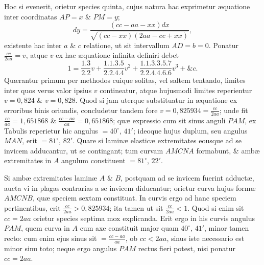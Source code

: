 Hoc si evenerit, orietur species quinta, cujus natura hac exprimetur æquatione inter coordinatas $AP=x$ \& $PM=y$;
\[dy=\frac{(cc-aa-xx)dx}{\sqrt{(cc-xx)(2aa-cc+xx)}},\]
existente hac inter $a$ \& $c$ relatione, ut sit intervallum $AD=b=0$. Ponatur
$\frac{cc}{2aa}=v$, atque $v$ ex hac æquatione infinita definiri debet
\[1=\frac{1.3}{2.2}v+\frac{1.1.3.5}{2.2.4.4}v^2+\frac{1.1.3.3.5.7}{2.2.4.4.6.6}v^3+\&c.\]
Quærantur primum per methodos cuique solitas, vel saltem tentando, limites inter quos verus valor ipsius $v$ contineatur, atque hujusmodi limites reperientur $v=0{,}824$ \& $v=0{,}828$. Quod si jam uterque substituatur in æquatione ex erroribus binis oriundis, concludetur tandem fore $v=0{,}825934=\frac{cc}{2aa}$; unde fit $\frac{cc}{aa}=1{,}651868$ \& $\frac{cc-aa}{aa}=0{,}651868$; quæ expressio cum sit sinus anguli $PAM$, ex Tabulis reperietur hic angulus $=40^\circ$, $41'$; ideoque hujus duplum, seu angulus $MAN$, erit $=81^\circ$, $82'$. Quare si laminæ elasticæ extremitates eousque ad se invicem adducantur, ut se contingant; tum curvam $AMCNA$ formabunt, \& ambæ extremitates in $A$ angulum constituent $=81^\circ$, $22'$.

Si ambæ extremitates laminæ $A$ \& $B$, postquam ad se invicem fuerint adductæ, aucta vi in plagas contrarias a se invicem diducantur; orietur curva hujus formæ $AMCNB$, quæ speciem sextam constituat. In curvis ergo ad hanc speciem pertinentibus, erit $\frac{cc}{2aa}>0{,}825934$; ita tamen ut sit $\frac{cc}{2aa}<1$. Quod si enim sit $cc=2aa$ orietur species septima mox explicanda. Erit ergo in his curvis angulus $PAM$, quem curva in $A$ cum axe constituit major quam $40^\circ$, $41'$, minor tamen recto: cum enim ejus sinus sit $=\frac{cc-aa}{aa}$, ob $cc<2aa$, sinus iste necessario est minor sinu toto; neque ergo angulus $PAM$ rectus fieri potest, nisi ponatur $cc=2aa$.

